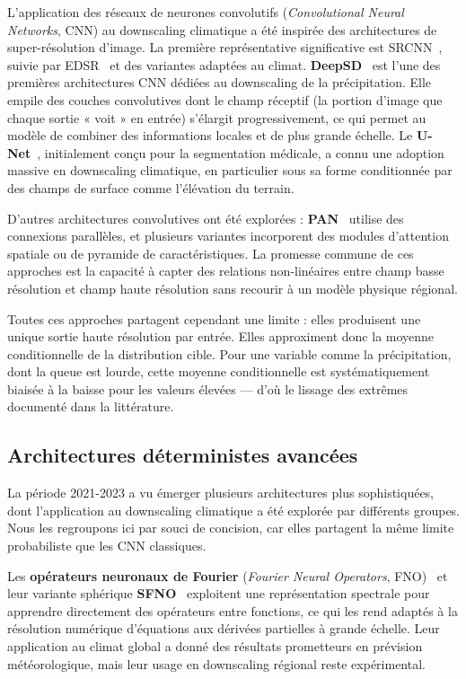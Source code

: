 \documentclass[14pt,a4paper,openany]{extreport}
\theoremstyle{definition}
\begin{document}
L'application des réseaux de neurones convolutifs (\emph{Convolutional Neural Networks}, CNN) au downscaling climatique a été inspirée des architectures de super-résolution d'image. La première représentative significative est SRCNN~\cite{dong_srcnn_2014}, suivie par EDSR~\cite{lim_edsr_2017} et des variantes adaptées au climat. \textbf{DeepSD}~\cite{vandal_deepsd_2017} est l'une des premières architectures CNN dédiées au downscaling de la précipitation. Elle empile des couches convolutives dont le champ réceptif (la portion d'image que chaque sortie « voit » en entrée) s'élargit progressivement, ce qui permet au modèle de combiner des informations locales et de plus grande échelle. Le \textbf{U-Net}~\cite{ronneberger_unet_2015}, initialement conçu pour la segmentation médicale, a connu une adoption massive en downscaling climatique, en particulier sous sa forme conditionnée par des champs de surface comme l'élévation du terrain.

D'autres architectures convolutives ont été explorées : \textbf{PAN}~\cite{pan_pan_2019} utilise des connexions parallèles, et plusieurs variantes incorporent des modules d'attention spatiale ou de pyramide de caractéristiques. La promesse commune de ces approches est la capacité à capter des relations non-linéaires entre champ basse résolution et champ haute résolution sans recourir à un modèle physique régional.

Toutes ces approches partagent cependant une limite : elles produisent une unique sortie haute résolution par entrée. Elles approximent donc la moyenne conditionnelle de la distribution cible. Pour une variable comme la précipitation, dont la queue est lourde, cette moyenne conditionnelle est systématiquement biaisée à la baisse pour les valeurs élevées --- d'où le lissage des extrêmes documenté dans la littérature.

\subsection{Architectures déterministes avancées}
\label{ssec:soa-avancees}

La période 2021-2023 a vu émerger plusieurs architectures plus sophistiquées, dont l'application au downscaling climatique a été explorée par différents groupes. Nous les regroupons ici par souci de concision, car elles partagent la même limite probabiliste que les CNN classiques.

Les \textbf{opérateurs neuronaux de Fourier} (\emph{Fourier Neural Operators}, FNO)~\cite{li_fno_2021} et leur variante sphérique \textbf{SFNO}~\cite{bonev_sfno_2023} exploitent une représentation spectrale pour apprendre directement des opérateurs entre fonctions, ce qui les rend adaptés à la résolution numérique d'équations aux dérivées partielles à grande échelle. Leur application au climat global a donné des résultats prometteurs en prévision météorologique, mais leur usage en downscaling régional reste expérimental.
\end{document}
